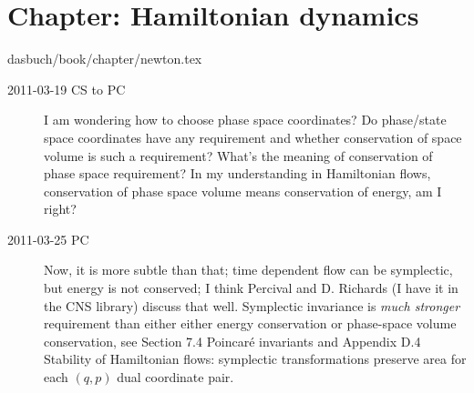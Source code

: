 \section{Chapter: Hamiltonian dynamics}
\label{c-newton}\noindent dasbuch/book/chapter/newton.tex
\begin{description}

\item[2011-03-19 CS to PC]
I am wondering how to choose phase space
coordinates? Do phase/state space coordinates have any requirement and
whether conservation of space volume is such a requirement? What's the
meaning of conservation of phase space requirement? In my understanding
in Hamiltonian flows, conservation of phase space volume means
conservation of energy, am I right?

\item[2011-03-25 PC]
Now, it is more subtle than that; time dependent flow can be symplectic,
but energy is not conserved; I think Percival and D.
Richards (I have it in the
 {CNS library})
discuss that well. Symplectic invariance is \emph{much stronger}
requirement than either either energy conservation or phase-space volume
conservation, see 
{Section 7.4 Poincar\'e invariants} and
 {Appendix D.4
Stability of Hamiltonian flows}: symplectic transformations preserve area
for each $(q,p)$ dual coordinate  pair.

\end{description}


